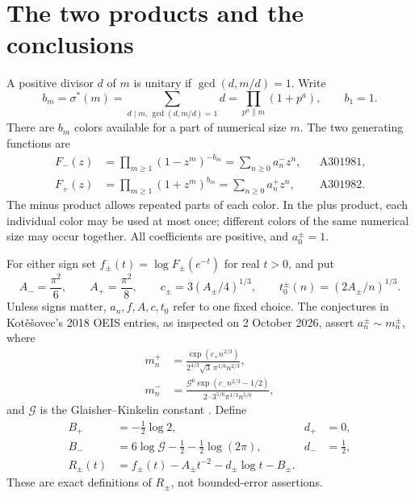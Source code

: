 \documentclass[11pt]{article}
\theoremstyle{remark}\newtheorem{remark}[theorem]{Remark}
\newcommand{\Gla}{\mathcal G}
\numberwithin{equation}{section}
\begin{document}
\section{The two products and the conclusions}\label{udp:sec:results}
A positive divisor $d$ of $m$ is unitary if $\gcd(d,m/d)=1$. Write
\begin{equation}\label{udp:eq:weight}
 b_m=\sigma^*(m)=\sum_{d\mid m,\,\gcd(d,m/d)=1}d
 =\prod_{p^a\parallel m}(1+p^a),\qquad b_1=1.
\end{equation}
There are $b_m$ colors available for a part of numerical size $m$. The two generating functions are
\begin{align}
 F_-(z)&=\prod_{m\ge1}(1-z^m)^{-b_m}=\sum_{n\ge0}a_n^-z^n,
 &&\text{A301981},\label{udp:eq:minus}\\
 F_+(z)&=\prod_{m\ge1}(1+z^m)^{b_m}=\sum_{n\ge0}a_n^+z^n,
 &&\text{A301982}.\label{udp:eq:plus}
\end{align}
The minus product allows repeated parts of each color. In the plus product, each individual color may be used at most once; different colors of the same numerical size may occur together. All coefficients are positive, and $a_0^\pm=1$.

For either sign set $f_\pm(t)=\log F_\pm(e^{-t})$ for real $t>0$, and put
\begin{equation}\label{udp:eq:constants}
 A_-=\frac{\pi^2}{6},\qquad A_+=\frac{\pi^2}{8},\qquad
 c_\pm=3(A_\pm/4)^{1/3},\qquad t_0^\pm(n)=(2A_\pm/n)^{1/3}.
\end{equation}
Unless signs matter, $a_n,f,A,c,t_0$ refer to one fixed choice. The conjectures in Kot\v{e}\v{s}ovec's 2018 OEIS entries, as inspected on 2 October 2026, assert $a_n^\pm\sim m_n^\pm$, where
\begin{align}
 m_n^+&=\frac{\exp(c_+n^{2/3})}{2^{4/3}\sqrt3\,\pi^{1/6}n^{2/3}},\label{udp:eq:modelplus}\\
 m_n^-&=\frac{\Gla^6\exp(c_-n^{2/3}-1/2)}{2\cdot3^{5/6}\pi^{1/3}n^{5/6}},\label{udp:eq:modelminus}
\end{align}
and $\Gla$ is the Glaisher--Kinkelin constant \cite{oeisminus,oeisplus}. Define
\begin{align}
 B_+&=-\tfrac12\log2,&d_+&=0,\nonumber\\
 B_-&=6\log\Gla-\tfrac12-\tfrac12\log(2\pi),&d_-&=\tfrac12,\label{udp:eq:B}\\
 R_\pm(t)&=f_\pm(t)-A_\pm t^{-2}-d_\pm\log t-B_\pm.\label{udp:eq:R}
\end{align}
These are exact definitions of $R_\pm$, not bounded-error assertions.
\end{document}
